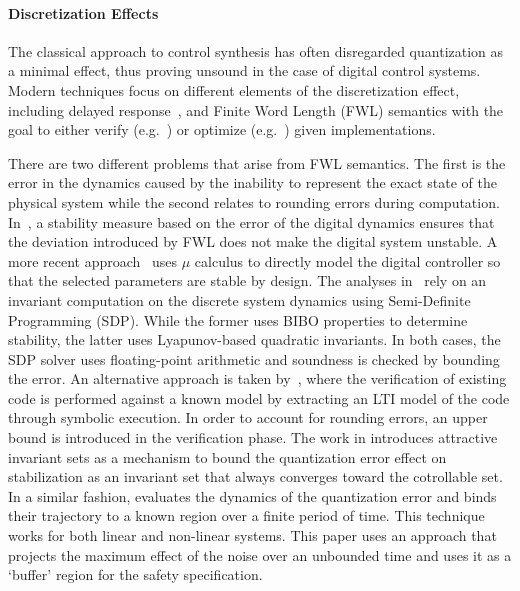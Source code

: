 \documentclass[runningheads,a4paper]{llncs}
\begin{document}
\paragraph{Discretization Effects}

The classical approach to control synthesis has often disregarded
quantization as a minimal effect, thus proving unsound in the case of digital control systems.
Modern techniques focus on different elements of the discretization effect, including delayed
response~\cite{Duggirala2015}, and Finite Word Length (FWL) semantics with
the goal to either verify (e.g.~\cite{daes20161}) or optimize
(e.g.~\cite{oudjida2014design}) given implementations.

There are two different problems that arise from FWL semantics.  The first
is the error in the dynamics caused by the inability to represent the exact
state of the physical system while the second relates to rounding errors
during computation.  In~\cite{fialho1994stability}, a stability measure
based on the error of the digital dynamics ensures that the deviation
introduced by FWL does not make the digital system unstable.  A more recent
approach~\cite{DBLP:journals/automatica/WuLCC09} uses $\mu$ calculus to
directly model the digital controller so that the selected parameters are
stable by design.  The analyses
in~\cite{DBLP:conf/hybrid/RouxJG15,DBLP:conf/hybrid/WangGRJF16} rely on an
invariant computation on the discrete system dynamics using Semi-Definite
Programming (SDP).  While the former uses BIBO properties to determine
stability, the latter uses Lyapunov-based quadratic invariants.  In both
cases, the SDP solver uses floating-point arithmetic and soundness is
checked by bounding the error.  An alternative approach is taken
by~\cite{park2016scalable}, where the verification of existing code is
performed against a known model by extracting an LTI model of the code
through symbolic execution.  In order to account for rounding errors, an
upper bound is introduced in the verification phase.
The work in \cite{picasso2003stabilization,picasso2002construction} introduces
attractive invariant sets as a mechanism to bound the quantization error effect
on stabilization as an invariant set that always converges toward the cotrollable
set. In a similar fashion, \cite{liberzon2003hybrid} evaluates the dynamics of the
quantization error and binds their trajectory to a known region over a finite
period of time. This technique works for both linear and non-linear systems.
This paper uses an approach that projects the maximum effect of the noise over
an unbounded time and uses it as a `buffer' region for the safety specification.
\end{document}
